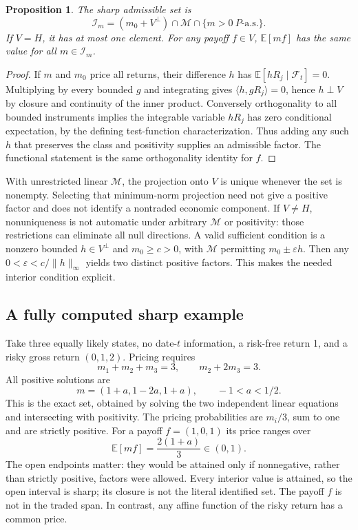 \documentclass[11pt]{article}
\newtheorem{proposition}{Proposition}
\newcommand{\E}{\mathbb E}
\begin{document}
\begin{proposition}
The sharp admissible set is
\[
 \mathcal I_m=(m_0+V^\perp)\cap\mathcal M\cap\{m>0\ P\text{-a.s.}\}.
\]
If $V=H$, it has at most one element. For any payoff $f\in V$,
$\E[mf]$ has the same value for all $m\in\mathcal I_m$.
\end{proposition}
\begin{proof}
If $m$ and $m_0$ price all returns, their difference $h$ has
$\E[hR_j\mid\mathcal F_t]=0$. Multiplying by every bounded $g$ and
integrating gives $\langle h,gR_j\rangle=0$, hence $h\perp V$ by
closure and continuity of the inner product. Conversely orthogonality to
all bounded instruments implies the integrable variable $hR_j$ has zero
conditional expectation, by the defining test-function characterization.
Thus adding any such $h$ that preserves the class and positivity supplies
an admissible factor. The functional statement is the same orthogonality
identity for $f$.
\end{proof}
With unrestricted linear $\mathcal M$, the projection onto $V$ is unique
whenever the set is nonempty. Selecting that minimum-norm projection need
not give a positive factor and does not identify a nontraded economic
component. If $V\neq H$, nonuniqueness is not automatic under arbitrary
$\mathcal M$ or positivity: those restrictions can eliminate all null
directions. A valid sufficient condition is a nonzero bounded
$h\in V^\perp$ and $m_0\geq c>0$, with $\mathcal M$ permitting
$m_0\pm\varepsilon h$. Then any
$0<\varepsilon<c/\|h\|_\infty$ yields two distinct positive factors.
This makes the needed interior condition explicit.

\subsection*{A fully computed sharp example}
Take three equally likely states, no date-$t$ information, a risk-free
return 1, and a risky gross return $(0,1,2)$. Pricing requires
\[
 m_1+m_2+m_3=3,\qquad m_2+2m_3=3.
\]
All positive solutions are
\[
 m=(1+a,1-2a,1+a),\qquad -1<a<1/2.
\]
This is the exact set, obtained by solving the two independent linear
equations and intersecting with positivity. The pricing probabilities
are $m_i/3$, sum to one and are strictly positive. For a payoff
$f=(1,0,1)$ its price ranges over
\[
 \E[mf]=\frac{2(1+a)}3\in(0,1).
\]
The open endpoints matter: they would be attained only if nonnegative,
rather than strictly positive, factors were allowed. Every interior value
is attained, so the open interval is sharp; its closure is not the literal
identified set. The payoff $f$ is not in the traded span. In contrast,
any affine function of the risky return has a common price.
\end{document}
